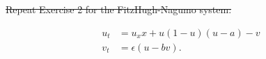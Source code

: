 \sout{Repeat Exercise 2 for the FitzHugh-Nagumo system:}

\begin{align*}
    u_t &= u_x x + u (1 - u)(u - a) - v \\
    v_t &= \epsilon (u - b v).
\end{align*}

